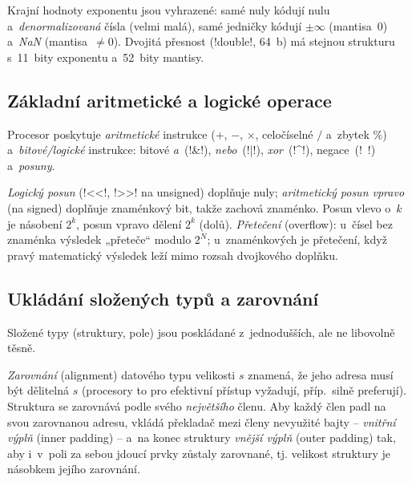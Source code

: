 \begin{poznamka}
Krajní hodnoty exponentu jsou vyhrazené: samé nuly kódují nulu a~\emph{denormalizovaná} čísla (velmi malá), samé jedničky kódují $\pm\infty$ (mantisa~0) a~\emph{NaN} (mantisa~$\neq0$). Dvojitá přesnost (\cd!double!, 64~b) má stejnou strukturu s~11~bity exponentu a~52~bity mantisy.
\end{poznamka}

\subsection{Základní aritmetické a logické operace}

Procesor poskytuje \emph{aritmetické} instrukce ($+$, $-$, $\times$, celočíselné $/$ a~zbytek $\%$) a~\emph{bitové/logické} instrukce: bitové \emph{a}~(\cd!&!), \emph{nebo}~(\cd!|!), \emph{xor}~(\cd!^!), negace~(\cd!~!) a~\emph{posuny}.

\begin{definice}
\emph{Logický posun} (\cd!<<!, \cd!>>! na unsigned) doplňuje nuly; \emph{aritmetický posun vpravo} (na signed) doplňuje znaménkový bit, takže zachová znaménko. Posun vlevo o~$k$ je násobení $2^{k}$, posun vpravo dělení $2^{k}$ (dolů). \emph{Přetečení} (overflow): u~čísel bez znaménka výsledek „přeteče`` modulo $2^{N}$; u~znaménkových je přetečení, když pravý matematický výsledek leží mimo rozsah dvojkového doplňku.
\end{definice}

\subsection{Ukládání složených typů a zarovnání}

Složené typy (struktury, pole) jsou poskládané z~jednodušších, ale ne libovolně těsně.

\begin{definice}
\emph{Zarovnání} (alignment) datového typu velikosti $s$ znamená, že jeho adresa musí být dělitelná $s$ (procesory to pro efektivní přístup vyžadují, příp.\ silně preferují). Struktura se zarovnává podle svého \emph{největšího} členu. Aby každý člen padl na svou zarovnanou adresu, vkládá překladač mezi členy nevyužité bajty -- \emph{vnitřní výplň} (inner padding) -- a~na konec struktury \emph{vnější výplň} (outer padding) tak, aby i~v~poli za sebou jdoucí prvky zůstaly zarovnané, tj. velikost struktury je násobkem jejího zarovnání.
\end{definice}

